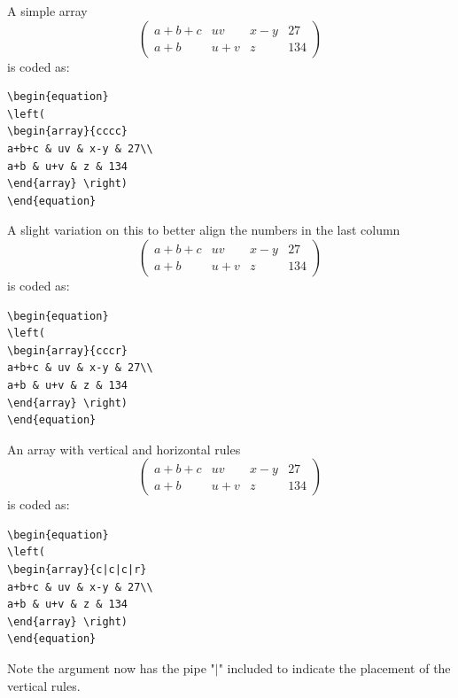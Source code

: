 \documentclass[]{IEEEtran}
\begin{document}
A simple array
\begin{equation}
	\left(
	\begin{array}{cccc}
		a+b+c & uv  & x-y & 27  \\
		a+b   & u+v & z   & 134
	\end{array}\right)
\end{equation}
is coded as:
\begin{verbatim}
\begin{equation}
\left(
\begin{array}{cccc}
a+b+c & uv & x-y & 27\\
a+b & u+v & z & 134
\end{array} \right)
\end{equation}
\end{verbatim}

A slight variation on this to better align the numbers in the last column
\begin{equation}
	\left(
	\begin{array}{cccr}
		a+b+c & uv  & x-y & 27  \\
		a+b   & u+v & z   & 134
	\end{array}\right)
\end{equation}
is coded as:
\begin{verbatim}
\begin{equation}
\left(
\begin{array}{cccr}
a+b+c & uv & x-y & 27\\
a+b & u+v & z & 134
\end{array} \right)
\end{equation}
\end{verbatim}

An array with vertical and horizontal rules
\begin{equation}
	\left( \begin{array}{c|c|c|r}
		a+b+c & uv  & x-y & 27  \\ \hline
		a+b   & u+v & z   & 134
	\end{array}\right)
\end{equation}
is coded as:
\begin{verbatim}
\begin{equation}
\left(
\begin{array}{c|c|c|r}
a+b+c & uv & x-y & 27\\
a+b & u+v & z & 134
\end{array} \right)
\end{equation}
\end{verbatim}
Note the argument now has the pipe "$\vert$" included to indicate the placement of the vertical rules.
\end{document}
